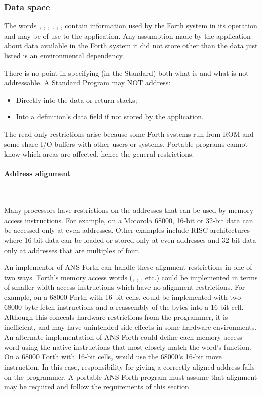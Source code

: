 \subsubsection{Data space} %
\label{rat:dataspace}

The words  , , ,
, , , %
 contain information used by the Forth system in its
operation and may be of use to the application. Any assumption made
by the application about data available in the Forth system it did
not store other than the data just listed is an environmental
dependency.

There is no point in specifying (in the Standard) both what is and
what is not addressable. A Standard Program may NOT address:

\begin{itemize}
\item Directly into the data or return stacks;
\item Into a definition's data field if not stored by the application.
\end{itemize}

The read-only restrictions arise because some Forth systems run from
ROM and some share I/O buffers with other users or systems. Portable
programs cannot know which areas are affected, hence the general
restrictions.

\paragraph{Address alignment} ~ %

Many processors have restrictions on the addresses that can be used
by memory access instructions. For example, on a Motorola 68000,
16-bit or 32-bit data can be accessed only at even addresses. Other
examples include RISC architectures where 16-bit data can be loaded
or stored only at even addresses and 32-bit data only at addresses
that are multiples of four.

An implementor of ANS Forth can handle these alignment restrictions
in one of two ways. Forth's memory access words (, \word{!},
\word{+!}, etc.) could be implemented in terms of smaller-width access
instructions which have no alignment restrictions. For example, on a
68000 Forth with 16-bit cells,  could be implemented with two
68000 byte-fetch instructions and a reassembly of the bytes into a
16-bit cell. Although this conceals hardware restrictions from the
programmer, it is inefficient, and may have unintended side effects
in some hardware environments. An alternate implementation of ANS Forth
could define each memory-access word using the native instructions
that most closely match the word's function. On a 68000 Forth with
16-bit cells,  would use the 68000's 16-bit move instruction.
In this case, responsibility for giving  a correctly-aligned
address falls on the programmer. A portable ANS Forth program must
assume that alignment may be required and follow the requirements of
this section.

